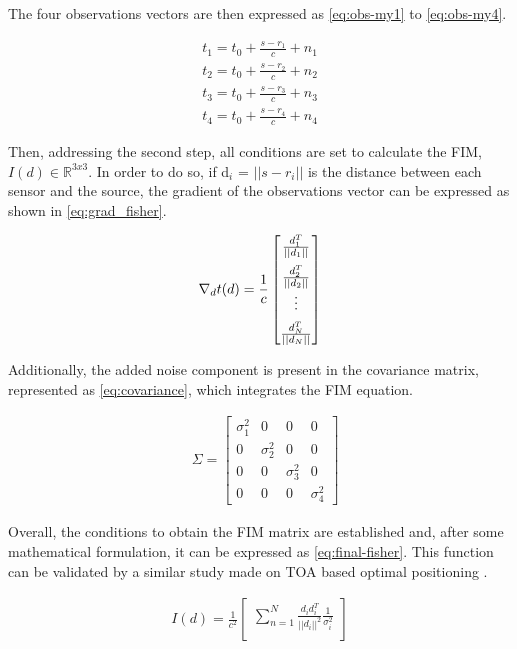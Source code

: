 The four observations vectors are then expressed as \ref{eq:obs-my1} to \ref{eq:obs-my4}.

\begin{eqnarray}
	t_1 = t_0 + \frac{s - r_1}{c} + n_1 \\
	\label{eq:obs-my1}
	t_2 = t_0 + \frac{s - r_2}{c} + n_2 \\
	\label{eq:obs-my2}
	t_3 = t_0 + \frac{s - r_3}{c} + n_3 \\
	\label{eq:obs-my3}
	t_4 = t_0 + \frac{s - r_4}{c} + n_4 
	\label{eq:obs-my4}
\end{eqnarray}

Then, addressing the second step, all conditions are set to calculate the FIM,  $I(d) \in \mathbb{R}^{3x3}$. In order to do so, if d$_{i}$ = $|| s - r_{i} ||$ is the distance between each sensor and the source, the gradient of the observations vector can be expressed as shown in \ref{eq:grad_fisher}.

\begin{eqnarray}
	\nabla_{d}t(d) = \frac{1}{c} 
	\begin{bmatrix}
		\frac{d_1^T}{||d_1||} \\ 
		\addlinespace
		\frac{d_2^T}{||d_2||} \\
		\vdots \\
		\addlinespace
		\frac{d_N^T}{||d_N||}
	\end{bmatrix}
	\label{eq:grad_fisher}
\end{eqnarray}

Additionally, the added noise component is present in the covariance matrix, represented as \ref{eq:covariance}, which integrates the FIM equation.

\begin{eqnarray}
	& \Sigma = 
	\begin{bmatrix}
		\sigma_1^2 & 0 & 0 & 0 \\
		0 & \sigma_2^2 & 0 & 0 \\
		0 & 0  & \sigma_3^2  & 0 \\
		0 & 0 & 0 & \sigma_4^2 
	\end{bmatrix}
	\label{eq:covariance}
\end{eqnarray}

Overall, the conditions to obtain the FIM matrix are established and, after some mathematical formulation, it can be expressed as \ref{eq:final-fisher}. This function can be validated by a similar study made on TOA based optimal positioning \cite{cramer-bruno}.

\begin{eqnarray}
	I(d) = \frac{1}{c^2} 
	\begin{bmatrix}
		\sum_{n=1}^{N} \frac{d_i d_i^T}{||d_i||^2} \frac{1}{\sigma_i^2}\\
	\end{bmatrix}
	\label{eq:final-fisher}
\end{eqnarray}

